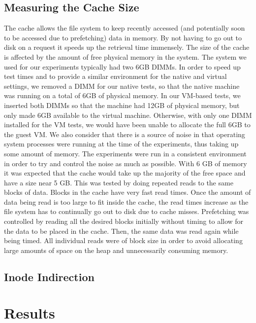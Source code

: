 \documentclass[letterpaper,twocolumn,10pt]{article}
\begin{document}
\subsection{Measuring the Cache Size}
The cache allows the file system to keep recently accessed (and potentially soon to be accessed due to prefetching) data in memory. 
By not having to go out to disk on a request it speeds up the retrieval time immensely. 
The size of the cache is affected by the amount of free physical memory in the system. 
The system we used for our experiments typically had two 6GB DIMMs. In order to speed up test times and to provide a similar environment for the native and virtual settings, we removed a DIMM for our native tests, so that the native machine was running on a total of 6GB of physical memory. In our VM-based tests, we inserted both DIMMs so that the machine had 12GB of physical memory, but only made 6GB available to the virtual machine. Otherwise, with only one DIMM installed for the VM tests, we would have been unable to allocate the full 6GB to the guest VM.
We also consider that there is a source of noise in that operating system processes were running at the time of the experiments, thus taking up some amount of memory.
The experiments were run in a consistent environment in order to try and control the noise as much as possible. 
With 6 GB of memory it was expected that the cache would take up the majority of the free space and have a size near 5 GB. 
This was tested by doing repeated reads to the same blocks of data. 
Blocks in the cache have very fast read times. 
Once the amount of data being read is too large to fit inside the cache, the read times increase as the file system has to continually go out to disk due to cache misses. 
Prefetching was controlled by reading all the desired blocks initially without timing to allow for the data to be placed in the cache. 
Then, the same data was read again while being timed. 
All individual reads were of block size in order to avoid allocating large amounts of space on the heap and unnecessarily consuming memory.

\subsection{Inode Indirection}


\section{Results}
\end{document}

